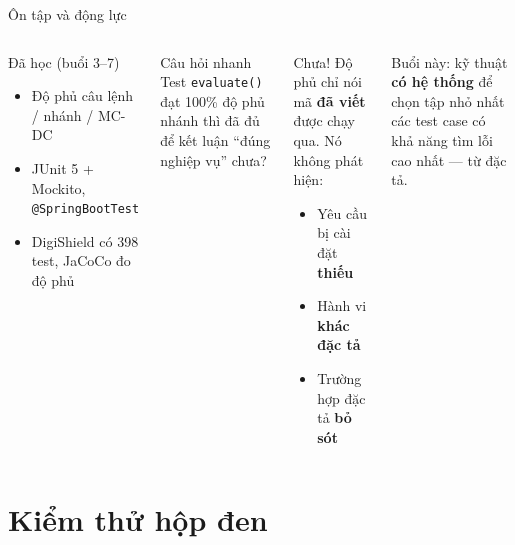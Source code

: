 \documentclass[aspectratio=169,12pt]{beamer}
\begin{document}
\begin{frame}{Ôn tập và động lực}
  \begin{columns}[T]
    \begin{block}{Đã học (buổi 3--7)}
      \begin{itemize}
        \item Độ phủ câu lệnh / nhánh / MC-DC
        \item JUnit 5 + Mockito, \texttt{@SpringBootTest}
        \item DigiShield có 398 test, JaCoCo đo độ phủ
      \end{itemize}
    \end{block}

    \begin{exampleblock}{Câu hỏi nhanh}
      Test \texttt{evaluate()} đạt 100\% độ phủ nhánh thì đã đủ
      để kết luận ``đúng nghiệp vụ'' chưa?
    \end{exampleblock}

    \begin{alertblock}{Chưa!}
      Độ phủ chỉ nói mã \textbf{đã viết} được chạy qua.
      Nó không phát hiện:
      \begin{itemize}
        \item Yêu cầu bị cài đặt \textbf{thiếu}
        \item Hành vi \textbf{khác đặc tả}
        \item Trường hợp đặc tả \textbf{bỏ sót}
      \end{itemize}
    \end{alertblock}
    {\small Buổi này: kỹ thuật \textbf{có hệ thống} để chọn tập nhỏ nhất
    các test case có khả năng tìm lỗi cao nhất --- từ đặc tả.}
  \end{columns}
\end{frame}

\section{Kiểm thử hộp đen}
\end{document}
